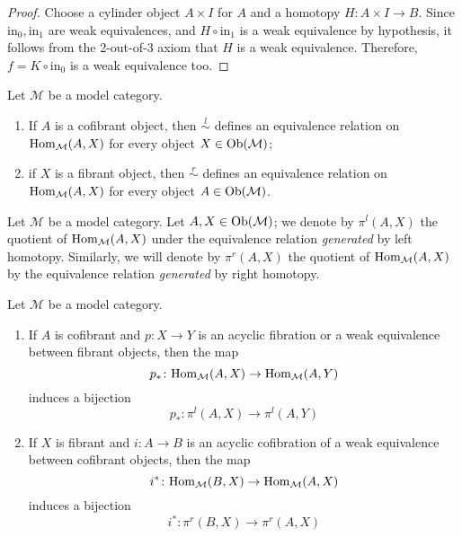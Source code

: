 \begin{proof}
Choose a cylinder object $A \times I$ for $A$ and a homotopy $H \colon A \times I \to B$. Since $\mathrm{in}_0, \mathrm{in}_1$ are weak equivalences, and $H \circ \mathrm{in}_1$ is a weak equivalence by hypothesis, it follows from the 2-out-of-3 axiom that $H$ is a weak equivalence. Therefore, $f = K \circ \mathrm{in}_0$ is a weak equivalence too.
\end{proof}

\begin{lemma} \label{lemma homotopy category 1}
Let $\mathcal M$ be a model category.
\begin{enumerate}
\item If $A$ is a cofibrant object, then $\stackrel{l}{\sim}$ defines an equivalence relation on $\mathrm{Hom}_{\mathcal M}(A,X)$ for every object $X \in \mathrm{Ob}(\mathcal M)$;
\item if $X$ is a fibrant object, then $\stackrel{r}{\sim}$ defines an equivalence relation on $\mathrm{Hom}_{\mathcal M}(A,X)$ for every object $A \in \mathrm{Ob}(\mathcal M)$.
\end{enumerate}
\end{lemma}

\begin{defin}
Let $\mathcal M$ be a model category. Let $A,X \in \mathrm{Ob}(\mathcal M)$; we denote by $\pi^l(A,X)$ the quotient of $\mathrm{Hom}_{\mathcal M}(A,X)$ under the equivalence relation \emph{generated} by left homotopy. Similarly, we will denote by $\pi^r(A,X)$ the quotient of $\mathrm{Hom}_{\mathcal M}(A,X)$ by the equivalence relation \emph{generated} by right homotopy.
\end{defin}

\begin{lemma} \label{lemma homotopy category 2}
Let $\mathcal M$ be a model category.
\begin{enumerate}
\item If $A$ is cofibrant and $p \colon X \to Y$ is an acyclic fibration or a weak equivalence between fibrant objects, then the map
\[
p_* \colon \mathrm{Hom}_{\mathcal M}(A,X) \to \mathrm{Hom}_{\mathcal M}(A,Y)
\]
induces a bijection
\[
p_* \colon \pi^l(A,X) \to \pi^l(A,Y)
\]
\item If $X$ is fibrant and $i \colon A \to B$ is an acyclic cofibration of a weak equivalence between cofibrant objects, then the map
\[
i^* \colon \mathrm{Hom}_{\mathcal M}(B,X) \to \mathrm{Hom}_{\mathcal M}(A,X)
\]
induces a bijection
\[
i^* \colon \pi^r(B,X) \to \pi^r(A,X)
\]
\end{enumerate}
\end{lemma}


